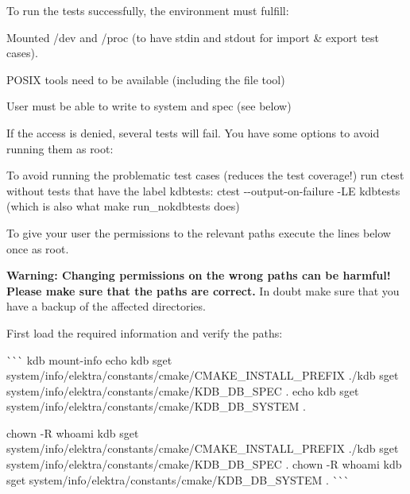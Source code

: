 To run the tests successfully, the environment must fulfill\+:


\begin{DoxyItemize}
\item Mounted /dev and /proc (to have stdin and stdout for import \& export test cases).
\item P\+O\+S\+IX tools need to be available (including the {\ttfamily file} tool)
\item User must be able to write to system and spec (see below)
\end{DoxyItemize}

If the access is denied, several tests will fail. You have some options to avoid running them as root\+:


\begin{DoxyEnumerate}
\item To avoid running the problematic test cases (reduces the test coverage!) run {\ttfamily ctest} without tests that have the label {\ttfamily kdbtests}\+: {\ttfamily ctest -\/-\/output-\/on-\/failure -\/LE kdbtests} (which is also what {\ttfamily make run\+\_\+nokdbtests} does)
\item To give your user the permissions to the relevant paths execute the lines below once as root.

{\bfseries{Warning\+: Changing permissions on the wrong paths can be harmful! Please make sure that the paths are correct.}} In doubt make sure that you have a backup of the affected directories.

First load the required information and verify the paths\+:

\`{}\`{}\`{} kdb mount-\/info echo {\ttfamily kdb sget system/info/elektra/constants/cmake/\+C\+M\+A\+K\+E\+\_\+\+I\+N\+S\+T\+A\+L\+L\+\_\+\+P\+R\+E\+F\+IX .}/{\ttfamily kdb sget system/info/elektra/constants/cmake/\+K\+D\+B\+\_\+\+D\+B\+\_\+\+S\+P\+EC .} echo {\ttfamily kdb sget system/info/elektra/constants/cmake/\+K\+D\+B\+\_\+\+D\+B\+\_\+\+S\+Y\+S\+T\+EM .} 
\begin{DoxyCode}{0}
\end{DoxyCode}
 chown -\/R {\ttfamily whoami} {\ttfamily kdb sget system/info/elektra/constants/cmake/\+C\+M\+A\+K\+E\+\_\+\+I\+N\+S\+T\+A\+L\+L\+\_\+\+P\+R\+E\+F\+IX .}/{\ttfamily kdb sget system/info/elektra/constants/cmake/\+K\+D\+B\+\_\+\+D\+B\+\_\+\+S\+P\+EC .} chown -\/R {\ttfamily whoami} {\ttfamily kdb sget system/info/elektra/constants/cmake/\+K\+D\+B\+\_\+\+D\+B\+\_\+\+S\+Y\+S\+T\+EM .} \`{}\`{}\`{}


\end{DoxyEnumerate}
